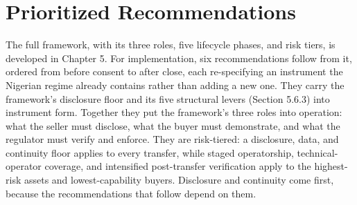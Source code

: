 \documentclass[twoside,fontset=lmodern]{mitthesis}
\begin{document}
\hypertarget{prioritized-recommendations}{%
\section{Prioritized
Recommendations}\label{prioritized-recommendations}}

The full framework, with its three roles, five lifecycle phases, and
risk tiers, is developed in Chapter 5. For implementation, six
recommendations follow from it, ordered from before consent to after
close, each re-specifying an instrument the Nigerian regime already
contains rather than adding a new one. They carry the framework's
disclosure floor and its five structural levers (Section 5.6.3) into
instrument form. Together they put the framework's three roles into
operation: what the seller must disclose, what the buyer must
demonstrate, and what the regulator must verify and enforce. They are
risk-tiered: a disclosure, data, and continuity floor applies to every
transfer, while staged operatorship, technical-operator coverage, and
intensified post-transfer verification apply to the highest-risk assets
and lowest-capability buyers. Disclosure and continuity come first,
because the recommendations that follow depend on them.
\end{document}
